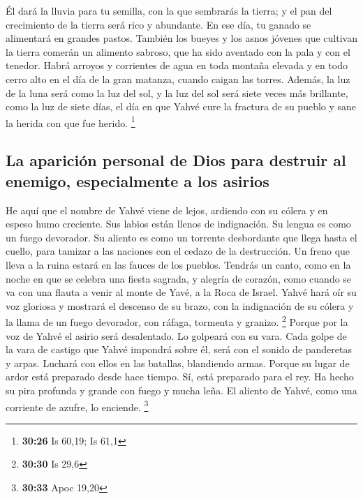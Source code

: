 \begin{paracol}{2}
 Él dará la lluvia para tu semilla, con la que sembrarás
la tierra; y el pan del crecimiento de la tierra será rico y abundante.
En ese día, tu ganado se alimentará en grandes pastos. 
También los bueyes y los asnos jóvenes que cultivan la tierra comerán un
alimento sabroso, que ha sido aventado con la pala y con el tenedor.
 Habrá arroyos y corrientes de agua en toda montaña
elevada y en todo cerro alto en el día de la gran matanza, cuando caigan
las torres.  Además, la luz de la luna será como la luz
del sol, y la luz del sol será siete veces más brillante, como la luz de
siete días, el día en que Yahvé cure la fractura de su pueblo y sane la
herida con que fue herido. \footnote{\textbf{30:26} Is 60,19; Is 61,1}

\hypertarget{la-apariciuxf3n-personal-de-dios-para-destruir-al-enemigo-especialmente-a-los-asirios}{%
\subsection{La aparición personal de Dios para destruir al enemigo,
especialmente a los
asirios}\label{la-apariciuxf3n-personal-de-dios-para-destruir-al-enemigo-especialmente-a-los-asirios}}

 He aquí que el nombre de Yahvé viene de lejos, ardiendo
con su cólera y en espeso humo creciente. Sus labios están llenos de
indignación. Su lengua es como un fuego devorador.  Su
aliento es como un torrente desbordante que llega hasta el cuello, para
tamizar a las naciones con el cedazo de la destrucción. Un freno que
lleva a la ruina estará en las fauces de los pueblos. 
Tendrás un canto, como en la noche en que se celebra una fiesta sagrada,
y alegría de corazón, como cuando se va con una flauta a venir al monte
de Yavé, a la Roca de Israel.  Yahvé hará oír su voz
gloriosa y mostrará el descenso de su brazo, con la indignación de su
cólera y la llama de un fuego devorador, con ráfaga, tormenta y granizo.
\footnote{\textbf{30:30} Is 29,6}  Porque por la voz de
Yahvé el asirio será desalentado. Lo golpeará con su vara.
 Cada golpe de la vara de castigo que Yahvé impondrá
sobre él, será con el sonido de panderetas y arpas. Luchará con ellos en
las batallas, blandiendo armas.  Porque su lugar de ardor
está preparado desde hace tiempo. Sí, está preparado para el rey. Ha
hecho su pira profunda y grande con fuego y mucha leña. El aliento de
Yahvé, como una corriente de azufre, lo enciende. \footnote{\textbf{30:33}
  Apoc 19,20}


\end{paracol}
